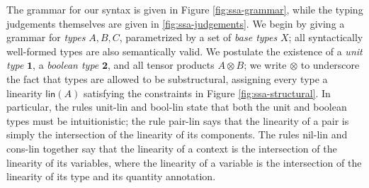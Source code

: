 \documentclass[acmsmall,screen,review]{acmart}
\newcommand{\mb}[1]{\ensuremath{\mathbf{#1}}}
\newcommand{\ms}[1]{\ensuremath{\mathsf{#1}}}
\newcommand{\rle}[1]{{\scriptsize\textsf{#1}}}
\begin{document}
The grammar for our syntax is given in Figure \ref{fig:ssa-grammar}, while the
typing judgements themselves are given in \ref{fig:ssa-judgements}. We begin by
giving a grammar for \textit{types} \(A, B, C\), parametrized by a set of
\textit{base types} \(X\); all syntactically well-formed types are also
semantically valid. We postulate the existence of a \textit{unit type}
\(\mb{1}\), a \textit{boolean type} \(\mb{2}\), and all tensor products \(A
\otimes B\); we write \(\otimes\) to underscore the fact that types are allowed
to be substructural, assigning every type a linearity \(\ms{lin}(A)\) satisfying
the constraints in Figure \ref{fig:ssa-structural}. In particular, the rules
\rle{unit-lin} and \rle{bool-lin} state that both the unit and boolean types
must be intuitionistic; the rule \rle{pair-lin} says that the linearity of a
pair is simply the intersection of the linearity of its components. The rules
\rle{nil-lin} and \rle{cons-lin} together say that the linearity of a context is
the intersection of the linearity of its variables, where the linearity of a
variable is the intersection of the linearity of its type and its quantity
annotation.
\end{document}
